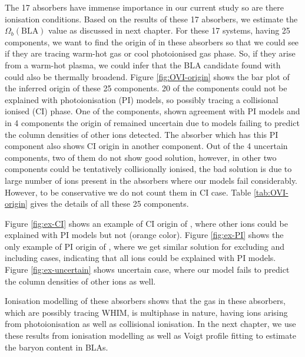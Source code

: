 The 17  absorbers have immense importance in our current study so are there ionisation conditions. Based on the results of these 17 absorbers, we estimate the $\Omega_b(\text{BLA})$ value as discussed in next chapter. For these 17 systems, having 25 components, we want to find the origin of  in these absorbers so that we could see if they are tracing warm-hot gas or cool photoionised gas phase. So, if they arise from a warm-hot plasma, we could infer that the BLA candidate found with  could also be thermally broadend. Figure \ref{fig:OVI-origin} shows the bar plot of the inferred origin of these 25 components. 20 of the components could not be explained with photoionisation (PI) models, so possibly tracing a collisional ionised (CI) phase. One of the components, shown agreement with PI models and in 4 components the origin of  remained uncertain due to models failing to predict the column densities of other ions detected. The absorber which has this PI component also shows CI origin in another component. Out of the 4 uncertain components, two of them do not show good solution, however, in other two components  could be tentatively collisionally ionised, the bad solution is due to large number of ions present in the absorbers where our models fail considerably. However, to be conservative we do not count them in CI case. Table \ref{tab:OVI-origin} gives the details of all these 25 components.

Figure \ref{fig:ex-CI} shows an example of CI origin of , where other ions could be explained with PI models but not  (orange color). Figure \ref{fig:ex-PI} shows the only example of PI origin of , where we get similar solution for excluding and including  cases, indicating that all ions could be explained with PI models. Figure \ref{fig:ex-uncertain} shows uncertain case, where our model fails to predict the column densities of other ions as well. 

Ionisation modelling of these absorbers shows that the gas in these absorbers, which are possibly tracing WHIM, is multiphase in nature, having ions arising from photoionisation as well as collisional ionisation. In the next chapter, we use these results from ionisation modelling as well as Voigt profile fitting to estimate the baryon content in BLAs.  


